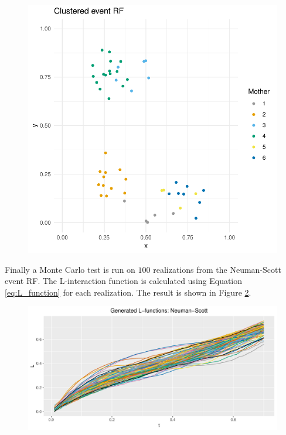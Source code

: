 \begin{figure}
    \centering
    \includegraphics[scale=0.95]{figures/cluster_event_rf.pdf}
    \caption{}
    \label{fig:cluster_event_rf}
\end{figure}

Finally a Monte Carlo test is run on $100$ realizations from the Neuman-Scott event RF. The L-interaction function is calculated using Equation \eqref{eq:L_function} for each realization. The result is shown in Figure \ref{fig:gen_ns_l}.

\begin{figure}
    \centering
    \includegraphics[scale=0.65]{figures/gen_ns_l.pdf}
    \caption{}
    \label{fig:gen_ns_l}
\end{figure}

